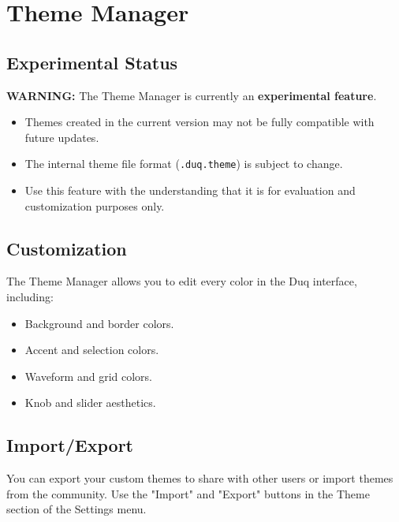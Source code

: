\chapter{Theme Manager}
\label{ch:theme_manager}

\section{Experimental Status}
\textbf{WARNING:} The Theme Manager is currently an \textbf{experimental feature}. 
\begin{itemize}
    \item Themes created in the current version may not be fully compatible with future updates.
    \item The internal theme file format (\texttt{.duq.theme}) is subject to change.
    \item Use this feature with the understanding that it is for evaluation and customization purposes only.
\end{itemize}

\section{Customization}
The Theme Manager allows you to edit every color in the Duq interface, including:
\begin{itemize}
    \item Background and border colors.
    \item Accent and selection colors.
    \item Waveform and grid colors.
    \item Knob and slider aesthetics.
\end{itemize}

\section{Import/Export}
You can export your custom themes to share with other users or import themes from the community. Use the "Import" and "Export" buttons in the Theme section of the Settings menu.
